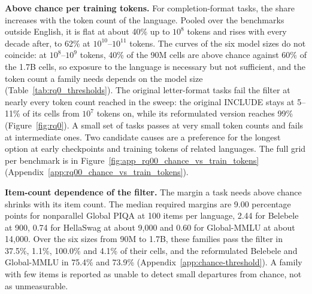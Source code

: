 \textbf{Above chance per training tokens.}
For completion-format tasks, the share increases with the token count of the language. Pooled over the benchmarks outside English, it is flat at about 40\% up to $10^{8}$ tokens and rises with every decade after, to 62\% at $10^{10}$--$10^{11}$ tokens.
The curves of the six model sizes do not coincide: at $10^{8}$--$10^{9}$ tokens, 40\% of the 90M cells are above chance against 60\% of the 1.7B cells, so exposure to the language is necessary but not sufficient, and the token count a family needs depends on the model size (Table~\ref{tab:rq0_thresholds}).
The original letter-format tasks fail the filter at nearly every token count reached in the sweep: the original INCLUDE stays at 5--11\% of its cells from $10^{7}$ tokens on, while its reformulated version reaches 99\% (Figure~\ref{fig:rq0}).
A small set of tasks passes at very small token counts and fails at intermediate ones. Two candidate causes are a preference for the longest option at early checkpoints %
and training tokens of related languages.
The full grid per benchmark is in Figure~\ref{fig:app_rq00_chance_vs_train_tokens} (Appendix~\ref{app:rq00_chance_vs_train_tokens}).


\textbf{Item-count dependence of the filter.} The margin a task needs above chance shrinks with its item count. The median required margins are 9.00 percentage points for nonparallel Global PIQA at 100 items per language, 2.44 for Belebele at 900, 0.74 for HellaSwag at about 9{,}000 and 0.60 for Global-MMLU at about 14{,}000. Over the six sizes from 90M to 1.7B, these families pass the filter in 37.5\%, 1.1\%, 100.0\% and 4.1\% of their cells, and the reformulated Belebele and Global-MMLU in 75.4\% and 73.9\% (Appendix~\ref{app:chance-threshold}). A family with few items is reported as unable to detect small departures from chance, not as unmeasurable.

